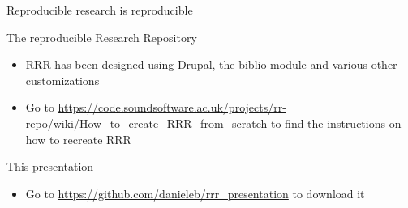 \documentclass[10pt]{beamer}
\begin{document}
\begin{frame}{Reproducible research is reproducible}
\begin{block}{The reproducible Research Repository}
\begin{itemize}
\item RRR has been designed using Drupal, the biblio module and various other customizations
\item Go to \url{https://code.soundsoftware.ac.uk/projects/rr-repo/wiki/How_to_create_RRR_from_scratch} to find the instructions on how to recreate RRR
\end{itemize}
\end{block}
\begin{block}{This presentation}
\begin{itemize}
\item Go to \url{https://github.com/danieleb/rrr_presentation} to download it
\end{itemize}
\end{block}
\end{frame}
\end{document}
